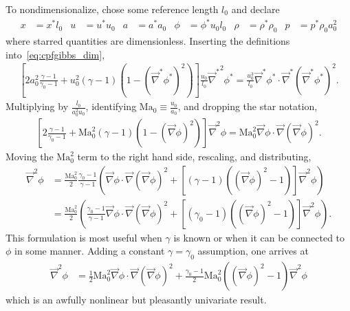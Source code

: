 \documentclass[letterpaper,11pt,nointlimits,reqno]{amsart}
\newcommand{\Mach}[1][]{\mbox{Ma}_{#1}}
\begin{document}
To nondimensionalize, chose some reference length $l_0$ and declare
\begin{align}
    x     &= x^\ast l_0
&   u     &= u^\ast u_0
&   a     &= a^\ast a_0
&   \phi  &= \phi^\ast u_0 l_0
&   \rho  &= \rho^\ast \rho_0
&   p     &= p^\ast \rho_0 a_0^2
\label{eq:nondimensionalization}
\end{align}
where starred quantities are dimensionless.  Inserting the definitions
into~\eqref{eq:cpfgibbs_dim},
\begin{align}
    \left[
          2a_0^2 \frac{\gamma-1}{\gamma_0-1}
        + u_0^2 \left(\gamma-1\right)
          \left(1 - \left(\vec{\nabla}^\ast\phi^\ast\right)^2\right)
    \right] \frac{u_0}{l_0} {\vec{\nabla}^\ast}^2\phi^\ast
     =       \frac{u_0^3}{l_0} \vec{\nabla}^\ast\phi^\ast
       \cdot \vec{\nabla}^\ast\left(\vec{\nabla}^\ast\phi^\ast\right)^2
.
\end{align}
Multiplying by $\frac{l_0}{a_0^2 u_0}$, identifying $\Mach[0] \equiv
\frac{u_0}{a_0}$, and dropping the star notation,
\begin{align}
    \left[
          2 \frac{\gamma-1}{\gamma_0-1}
        + \Mach[0]^2 \left(\gamma-1\right)
          \left(1 - \left(\vec{\nabla}\phi\right)^2\right)
    \right] {\vec{\nabla}}^2\phi
     =       \Mach[0]^2 \vec{\nabla}\phi
       \cdot \vec{\nabla}\left(\vec{\nabla}\phi\right)^2
.
\end{align}
Moving the $\Mach[0]^2$ term to the right hand side, rescaling, and distributing,
\begin{align}
       {\vec{\nabla}}^2\phi
    &= \frac{\Mach[0]^2}{2}\frac{\gamma_0-1}{\gamma-1} \left(
         \vec{\nabla}\phi \cdot \vec{\nabla}\left(\vec{\nabla}\phi\right)^2
       +
       \left[
             \left(\gamma-1\right)
             \left(\left(\vec{\nabla}\phi\right)^2 - 1\right)
       \right] {\vec{\nabla}}^2\phi
       \right)
\\  &= \frac{\Mach[0]^2}{2} \left(
         \frac{\gamma_0-1}{\gamma-1}
         \vec{\nabla}\phi \cdot \vec{\nabla}\left(\vec{\nabla}\phi\right)^2
       +
       \left[
             \left(\gamma_0-1\right)
             \left(\left(\vec{\nabla}\phi\right)^2 - 1\right)
       \right] {\vec{\nabla}}^2\phi
       \right)
.
\end{align}
This formulation is most useful when $\gamma$ is known or when it can be
connected to $\phi$ in some manner.  Adding a constant $\gamma=\gamma_0$
assumption, one arrives at
\begin{align}
       {\vec{\nabla}}^2\phi
    &=   \frac{1}{2}\Mach[0]^2
         \vec{\nabla}\phi \cdot \vec{\nabla}\left(\vec{\nabla}\phi\right)^2
       +
         \frac{\gamma_0-1}{2}\Mach[0]^2
         \left(\left(\vec{\nabla}\phi\right)^2 - 1\right)
         {\vec{\nabla}}^2\phi
\label{eq:cpfgibbs_nondim}
\end{align}
which is an awfully nonlinear but pleasantly univariate result.
\end{document}
